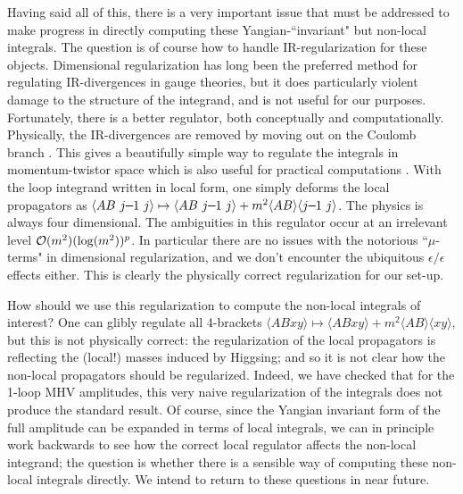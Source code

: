 \documentclass[11pt, reqno]{article}
\newcommand{\smallminus}{{\rm\rule[2.4pt]{6pt}{0.65pt}}}
\newcommand{\ab}[1]{\langle #1\rangle}
\begin{document}
Having said all of this, there is a very important issue that must be addressed to make progress in directly computing these Yangian-``invariant" but non-local integrals. The question is of course how to handle IR-regularization for these objects. Dimensional regularization has long been the preferred method for regulating IR-divergences in gauge theories, but it does particularly violent damage to the structure of the integrand, and is not useful for our purposes. Fortunately, there is a better regulator, both conceptually and computationally.
Physically, the IR-divergences are removed by moving out on the
Coulomb branch \cite{Alday:2009zm}. This gives a beautifully simple
way to regulate the integrals in momentum-twistor space which is also useful for practical computations \cite{Henn:2010bk, Henn:2010ir}. With the loop integrand written in local form, one simply deforms the local propagators as \mbox{$\ab{AB\,\,j\smallminus1\,\,j}
\mapsto \ab{AB \,\,j\smallminus1\,\,j} + m^2 \langle AB \rangle \langle j\smallminus1 \,\, j \rangle$}. The physics is always four dimensional. The ambiguities in this regulator occur  at an irrelevant level $\mathcal{O}(m^2) ({\rm log}(m^2))^p$. In particular there are no issues with the notorious ``$\mu$-terms" in dimensional regularization, and we don't encounter the ubiquitous $\epsilon/\epsilon$ effects either. This is clearly the physically correct regularization for our set-up.

How should we use this regularization to compute the
non-local integrals of interest? One can glibly regulate all
4-brackets $\ab{AB xy} \mapsto \ab{AB xy} + m^2 \langle AB\rangle \langle
xy \rangle$, but this is not physically correct: the regularization of the local propagators is reflecting the (local!) masses induced by Higgsing; and so it is not clear how the
non-local propagators should be regularized. Indeed, we have checked that for the 1-loop MHV amplitudes, this very
naive regularization of the integrals does not produce the standard result. Of course, since the Yangian invariant form of the full amplitude can be expanded in terms of local integrals, we can in principle work backwards to see how the correct local regulator affects the non-local integrand; the question is whether there is a sensible way of computing these non-local integrals directly. We intend to return to these questions in near future.
\end{document}

